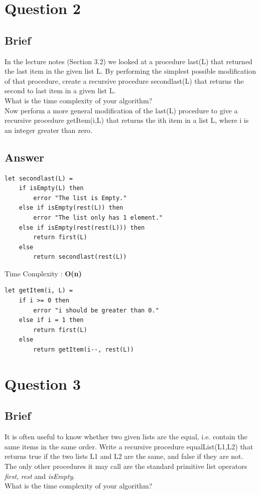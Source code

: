 \documentclass{article}
\begin{document}
\section{Question 2}
\subsection{Brief}
In the lecture notes (Section 3.2) we looked at a procedure last(L) that returned the last item in the given list L. By performing the simplest possible modification of that procedure, create a recursive procedure secondlast(L) that returns the second to last item in a given list L.
\\ \newline
What is the time complexity of your algorithm?
\\ \newline
Now perform a more general modification of the last(L) procedure to give a recursive
procedure getItem(i,L) that returns the ith item in a list L, where i is an integer greater than zero.
\\ \newline

\subsection{Answer}
\begin{lstlisting}
let secondlast(L) =
    if isEmpty(L) then
        error "The list is Empty."
    else if isEmpty(rest(L)) then
        error "The list only has 1 element."
    else if isEmpty(rest(rest(L))) then
        return first(L)
    else
        return secondlast(rest(L))
\end{lstlisting}
Time Complexity : \textbf{O(n)}
\begin{lstlisting}
let getItem(i, L) =
    if i >= 0 then 
        error "i should be greater than 0."
    else if i = 1 then
        return first(L)
    else
        return getItem(i--, rest(L))
\end{lstlisting}

\section{Question 3}
\subsection{Brief}
It is often useful to know whether two given lists are the equal, i.e. contain the same items in the same order.  Write a recursive procedure equalList(L1,L2) that returns true if the two lists L1 and L2 are the same, and false if they are not. The only other procedures it may call are the standard primitive list operators \textit{first}, \textit{rest} and \textit{isEmpty}.
\\ \newline
What is the time complexity of your algorithm?
\end{document}
